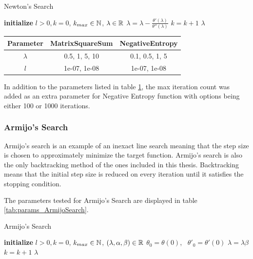 \documentclass[a4paper,english,titlepage,12pt]{article}
\newcommand{\abs}[1]{\ensuremath|#1|}
\newcommand{\R}{\ensuremath\mathbb{R}}
\newcommand{\N}{\ensuremath\mathbb{N}}
\begin{document}
\begin{algorithm}[H]
\caption{Newton's Search}
\label{alg_newtons_search}
\begin{algorithmic}[1]
\STATE \textbf{initialize} $l > 0, k = 0$, $k_{max} \in \N$, $\lambda \in \R$
\WHILE{$\abs{\theta'(\lambda)} > l$ \AND $k < k_{max}$}
    \STATE $\lambda = \lambda -\frac{\theta'(\lambda)}{\theta''(\lambda)}$
    \STATE $k = k + 1$
\ENDWHILE
\RETURN $\lambda$
\end{algorithmic}
\end{algorithm}

\begin{table}[H]
\label{tab:params_NewtonsSearch}
\centering
{}
\begin{tabular}{|c|c|c|}
\hline
\rowcolor{gray!25}
Parameter & MatrixSquareSum & NegativeEntropy \\
\hline
$\lambda$ & 0.5, 1, 5, 10 & 0.1, 0.5, 1, 5 \\
$l$ & 1e-07, 1e-08 & 1e-07, 1e-08 \\
\hline
\end{tabular}
\end{table}

In addition to the parameters listed in table \ref{tab:params_NewtonsSearch}, the max iteration count was added as an extra parameter for Negative Entropy function with options being either 100 or 1000 iterations.


\subsubsection{Armijo's Search}

Armijo's search is an example of an inexact line search meaning that the step size is chosen to approximately minimize the target function. Armijo's search is also the only backtracking method of the ones included in this thesis. Backtracking means that the initial step size is reduced on every iteration until it satisfies the stopping condition. \cite{book:convex_optimization}

The parameters tested for Armijo's Search are displayed in table \ref{tab:params_ArmijoSearch}.

\begin{algorithm}[H]
\caption{Armijo's Search}
\label{alg_armijo}
\begin{algorithmic}[1]
\STATE \textbf{initialize} $l > 0, k = 0$, $k_{max} \in \N$, $(\lambda, \alpha, \beta) \in \R$
\STATE $\theta_0 = \theta(0)$, \ $\theta'_0 = \theta'(0)$
    \STATE $\lambda = \lambda \beta$
    \STATE $k = k + 1$
\ENDWHILE
\RETURN $\lambda$
\end{algorithmic}
\end{algorithm}
\end{document}
